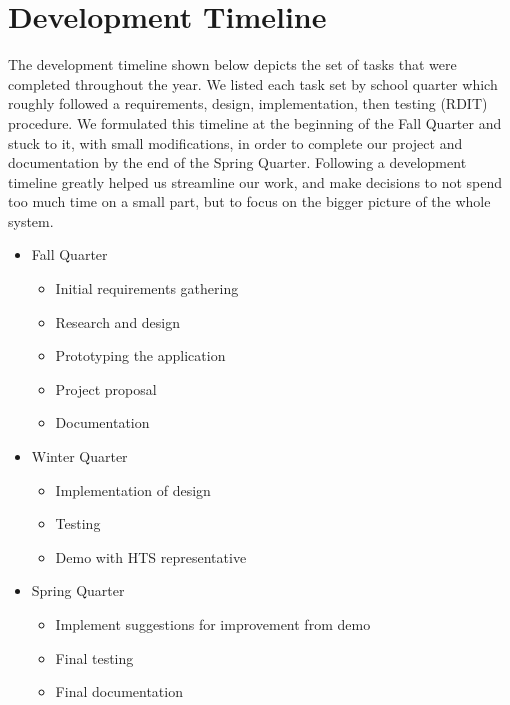 \chapter{Development Timeline}
The development timeline shown below depicts the set of tasks that were completed throughout the year. We listed each task set by school quarter which roughly followed a requirements, design, implementation, then testing (RDIT) procedure. We formulated this timeline at the beginning of the Fall Quarter and stuck to it, with small modifications, in order to complete our project and documentation by the end of the Spring Quarter. Following a development timeline greatly helped us streamline our work, and make decisions to not spend too much time on a small part, but to focus on the bigger picture of the whole system.

\begin{itemize}
	\item Fall Quarter
		\begin{itemize}
			\item Initial requirements gathering
			\item Research and design
			\item Prototyping the application
			\item Project proposal
			\item Documentation
		\end{itemize}
	\item Winter Quarter
		\begin{itemize}
			\item Implementation of design
			\item Testing
			\item Demo with HTS representative
		\end{itemize}
	\item Spring Quarter
		\begin{itemize}
			\item Implement suggestions for improvement from demo
			\item Final testing
			\item Final documentation
		\end{itemize}
\end{itemize}